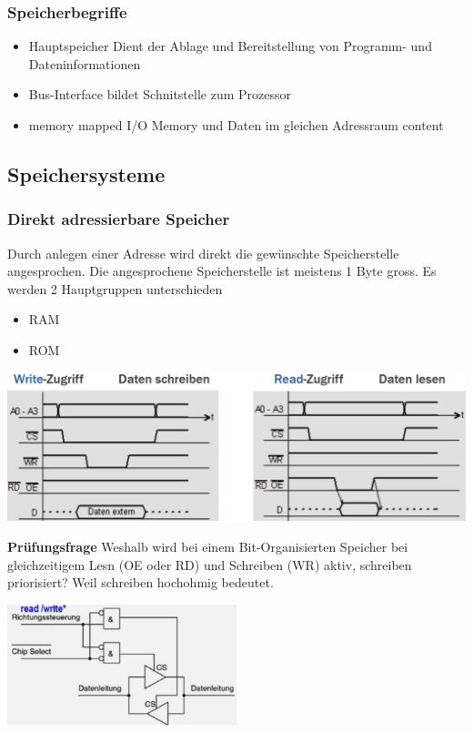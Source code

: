 \subsubsection{Speicherbegriffe}
\begin{itemize}
    \item Hauptspeicher
    \subitem Dient der Ablage und Bereitstellung von Programm- und Dateninformationen
    \item Bus-Interface
    \subitem bildet Schnitstelle zum Prozessor
    \item memory mapped I/O
    \subitem Memory und Daten im gleichen Adressraum
    content
\end{itemize}

\subsection{Speichersysteme}
\subsubsection{Direkt adressierbare Speicher}
Durch anlegen einer Adresse wird direkt die gewünschte Speicherstelle angesprochen.\newline
Die angesprochene Speicherstelle ist meistens 1 Byte gross.\newline
Es werden 2 Hauptgruppen unterschieden
\begin{itemize}
    \item RAM
    \item ROM
\end{itemize}
\begin{minipage}{0.5\linewidth}
    \includegraphics[width=\textwidth]{images/SystembusSpeicherSpeichersystem/SpeicherSysDirectMem}
\end{minipage}\newline
\textbf{Prüfungsfrage}\newline
Weshalb wird bei einem Bit-Organisierten Speicher bei gleichzeitigem Lesn (OE oder RD) und Schreiben (WR) aktiv, schreiben priorisiert?\newline
Weil schreiben hochohmig bedeutet.
\begin{minipage}{0.5\linewidth}
    \includegraphics[width=0.5\textwidth]{images/SystembusSpeicherSpeichersystem/SpeicherSysDirectMemPrue}
\end{minipage}

